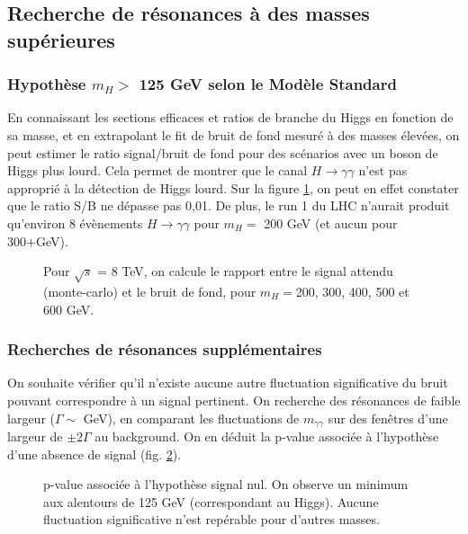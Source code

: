 \documentclass[11pt]{article} %
\begin{document}
\subsection{Recherche de résonances à des masses supérieures }

\subsubsection{Hypothèse $m_H >$ 125 GeV selon le Modèle Standard}

En connaissant les sections efficaces et ratios de branche du Higgs en fonction de sa masse, et en extrapolant le fit de bruit de fond mesuré à des masses élevées, on peut estimer le ratio signal/bruit de fond pour des scénarios avec un boson de Higgs plus lourd. Cela permet de montrer que le canal $H \to \gamma \gamma$ n'est pas approprié à la détection de Higgs lourd. Sur la figure  \ref{fig:higgs_lourds_gg}, on peut en effet constater que le ratio S/B ne dépasse pas 0,01. De plus, le run 1 du LHC n'aurait produit qu'environ 8 évènements $H \to \gamma \gamma$ pour $m_H =$ 200 GeV (et aucun pour 300+GeV).
\begin{figure}[H]
\centering
  \caption{Pour $\sqrt{s}$ = 8 TeV, on calcule le rapport entre le signal attendu (monte-carlo) et le bruit de fond, pour $m_H =$200, 300, 400, 500 et 600 GeV.  }
\label{fig:higgs_lourds_gg} 
 \resizebox{.9\linewidth}{!}{}
\end{figure}

\subsubsection{Recherches de résonances supplémentaires}

On souhaite vérifier qu'il n'existe aucune autre fluctuation significative du bruit pouvant correspondre à un signal pertinent. On recherche des résonances de faible largeur ($\Gamma \sim$ GeV), en comparant les fluctuations de $m_{\gamma\gamma}$ sur des fenêtres d'une largeur de $\pm 2 \Gamma$ au background. On en déduit la p-value associée à l'hypothèse d'une absence de signal (fig. \ref{fig:pvalue}).

\begin{figure}[H]
\centering
  \caption{p-value associée à l'hypothèse signal nul. On observe un minimum aux alentours de 125 GeV (correspondant au Higgs). Aucune fluctuation significative n'est repérable pour d'autres masses.  }
\label{fig:pvalue}
 \resizebox{.9\linewidth}{!}{}
\end{figure}
\end{document}
